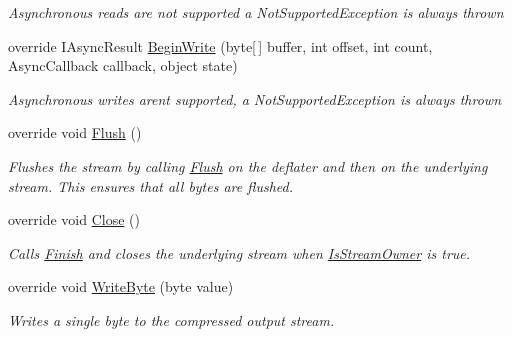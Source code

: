 \begin{DoxyCompactItemize}
\begin{DoxyCompactList}\small\item\em Asynchronous reads are not supported a Not\+Supported\+Exception is always thrown \end{DoxyCompactList}\item 
override I\+Async\+Result \hyperlink{class_i_c_sharp_code_1_1_sharp_zip_lib_1_1_zip_1_1_compression_1_1_streams_1_1_deflater_output_stream_aaecb4a3c808b5ff72cc3dddaad767918}{Begin\+Write} (byte\mbox{[}$\,$\mbox{]} buffer, int offset, int count, Async\+Callback callback, object state)
\begin{DoxyCompactList}\small\item\em Asynchronous writes arent supported, a Not\+Supported\+Exception is always thrown \end{DoxyCompactList}\item 
override void \hyperlink{class_i_c_sharp_code_1_1_sharp_zip_lib_1_1_zip_1_1_compression_1_1_streams_1_1_deflater_output_stream_a11795f61f58c5ee2d9fb8a33d8ea0d7e}{Flush} ()
\begin{DoxyCompactList}\small\item\em Flushes the stream by calling \hyperlink{class_i_c_sharp_code_1_1_sharp_zip_lib_1_1_zip_1_1_compression_1_1_streams_1_1_deflater_output_stream_a11795f61f58c5ee2d9fb8a33d8ea0d7e}{Flush} on the deflater and then on the underlying stream. This ensures that all bytes are flushed. \end{DoxyCompactList}\item 
override void \hyperlink{class_i_c_sharp_code_1_1_sharp_zip_lib_1_1_zip_1_1_compression_1_1_streams_1_1_deflater_output_stream_a9c7b7ad6415b77846d1a68e87ae55b8e}{Close} ()
\begin{DoxyCompactList}\small\item\em Calls \hyperlink{class_i_c_sharp_code_1_1_sharp_zip_lib_1_1_zip_1_1_compression_1_1_streams_1_1_deflater_output_stream_ac81f3e741a1ffdf98c02a171ad7cb334}{Finish} and closes the underlying stream when \hyperlink{class_i_c_sharp_code_1_1_sharp_zip_lib_1_1_zip_1_1_compression_1_1_streams_1_1_deflater_output_stream_a741aa9d79b2ebbb0fcd88d951935fd88}{Is\+Stream\+Owner} is true. \end{DoxyCompactList}\item 
override void \hyperlink{class_i_c_sharp_code_1_1_sharp_zip_lib_1_1_zip_1_1_compression_1_1_streams_1_1_deflater_output_stream_aeca95258efab3e3e1d03cac35c3b5815}{Write\+Byte} (byte value)
\begin{DoxyCompactList}\small\item\em Writes a single byte to the compressed output stream. \end{DoxyCompactList}\item 

\end{DoxyCompactItemize}
